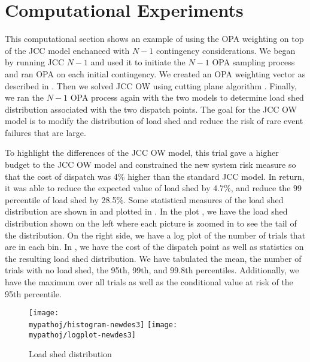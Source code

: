 \section{Computational Experiments}
This computational section shows an example of using the OPA weighting on top of the JCC model enchanced with $N-1$ contingency considerations. We began by  running JCC $N-1$  and used it to initiate the $N-1$ OPA sampling process and ran OPA on each initial contingency.  We created an OPA weighting vector as described in .  Then we solved JCC OW  using cutting plane algorithm .  Finally, we ran the $N-1$ OPA process again with the two models to determine load shed distribution associated with the two dispatch points.   The goal for the JCC OW model is to modify the distribution of load shed and reduce the risk of rare event failures that are large.  

To highlight the differences of the JCC OW model, this trial gave a higher budget to the JCC OW model and constrained the new system risk measure so that the cost of dispatch was 4\% higher than the standard JCC model.  In return, it was able to reduce the expected value of load shed by 4.7\%, and reduce the 99 percentile of load shed by 28.5\%.  Some statistical measures of the load shed distribution are shown in  and plotted in .  In the plot , we have the load shed distribution shown on the left where each picture is zoomed in to see the tail of the distribution.  On the right side, we have a log plot of the number of trials that are in each bin.  In , we have the cost of the dispatch point as well as statistics on the resulting load shed distribution.  We have tabulated the mean, the number of trials with no load shed, the 95th, 99th, and 99.8th percentiles.  Additionally, we have the maximum over all trials as well as the conditional value at risk of the 95th percentile.

\begin{figure}
\centering
\texttt{[image: \\mypathoj/histogram-newdes3]}
\texttt{[image: \\mypathoj/logplot-newdes3]}
\caption{Load shed distribution}
\label{load_shed_dist_ow}
\end{figure}


